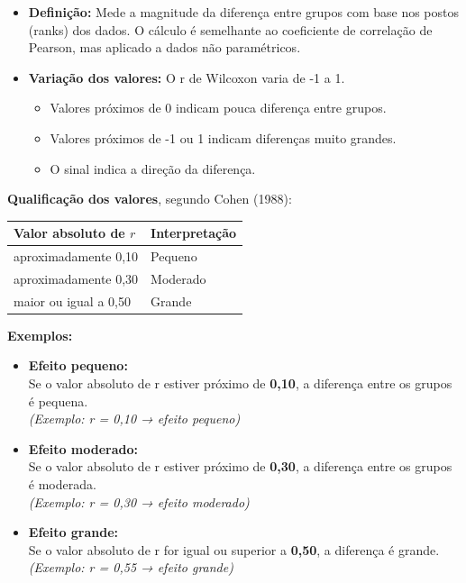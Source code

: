 \documentclass[
]{book}
\newcounter{none} %
\providecommand{\tightlist}{%
  \setlength{\itemsep}{0pt}\setlength{\parskip}{0pt}}
\begin{document}
\begin{itemize}
\tightlist
\item
  \textbf{Definição:} Mede a magnitude da diferença entre grupos com base nos postos (ranks) dos dados. O cálculo é semelhante ao coeficiente de correlação de Pearson, mas aplicado a dados não paramétricos.
\item
  \textbf{Variação dos valores:} O r de Wilcoxon varia de -1 a 1.

  \begin{itemize}
  \tightlist
  \item
    Valores próximos de 0 indicam pouca diferença entre grupos.
  \item
    Valores próximos de -1 ou 1 indicam diferenças muito grandes.
  \item
    O sinal indica a direção da diferença.
  \end{itemize}
\end{itemize}

\textbf{Qualificação dos valores}, segundo Cohen (1988):

{\def\LTcaptype{none} %
\begin{longtable}[]{@{}ll@{}}
\toprule\noalign{}
Valor absoluto de \(r\) & Interpretação \\
\midrule\noalign{}
\endhead
\bottomrule\noalign{}
\endlastfoot
aproximadamente 0,10 & Pequeno \\
aproximadamente 0,30 & Moderado \\
maior ou igual a 0,50 & Grande \\
\end{longtable}
}

\textbf{Exemplos:}

\begin{itemize}
\item
  \textbf{Efeito pequeno:}\\
  Se o valor absoluto de r estiver próximo de \textbf{0,10}, a diferença entre os grupos é pequena.\\
  \emph{(Exemplo: \textbar r\textbar{} = 0,10 → efeito pequeno)}
\item
  \textbf{Efeito moderado:}\\
  Se o valor absoluto de r estiver próximo de \textbf{0,30}, a diferença entre os grupos é moderada.\\
  \emph{(Exemplo: \textbar r\textbar{} = 0,30 → efeito moderado)}
\item
  \textbf{Efeito grande:}\\
  Se o valor absoluto de r for igual ou superior a \textbf{0,50}, a diferença é grande.\\
  \emph{(Exemplo: \textbar r\textbar{} = 0,55 → efeito grande)}
\end{itemize}
\end{document}
